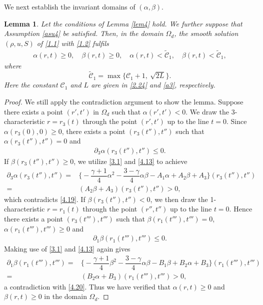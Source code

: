 \documentclass[11pt,reqno]{article}
\newtheorem{lem}{Lemma}[section]
\newcommand{\pa}{\partial}
\numberwithin{equation}{section}
\begin{document}
We next establish the invariant domains of $(\alpha,\beta)$.
\begin{lem}\label{lem5}
Let the conditions of Lemma \ref{lem4} hold. We further suppose that Assumption \ref{asu4} be satisfied. Then, in the domain $\Omega_d$, the smooth solution $(\rho, u, S)$ of \eqref{1.1} with \eqref{1.2} fulfils
\begin{align}\label{4.18}
\alpha(r,t)\geq0,\quad \beta(r,t)\geq0,\quad \alpha(r,t)< \widetilde{\mathcal{C}}_1,\quad \beta(r,t)< \widetilde{\mathcal{C}}_1,
\end{align}
where
$$
\widetilde{\mathcal{C}}_1=\max\{\mathcal{C}_1+1, \ \sqrt{2L}\}.
$$
Here the constant $\mathcal{C}_1$ and $L$ are given in \eqref{2.24} and \eqref{a3}, respectively.
\end{lem}
\begin{proof}
We still apply the contradiction argument to show the lemma. Suppose there exists a point $(r',t')$ in $\Omega_d$ such that $\alpha(r', t')<0$. We draw the 3-characteristic $r=r_3(t)$ through the point $(r',t')$ up to the line $t=0$. Since $\alpha(r_3(0),0)\geq0$, there exists a point $(r_3(t''),t'')$ such that $\alpha(r_3(t''),t'')=0$ and
\begin{align}\label{4.19}
\pa_3\alpha(r_3(t''),t'')\leq0.
\end{align}
If $\beta(r_3(t''),t'')\geq0$, we utilize \eqref{3.1} and \eqref{4.13} to achieve
\begin{align*}
\pa_3 \alpha(r_3(t''),t'') =& \bigg\{ -\dfrac{\gamma+1}{4} \alpha^{2}
  -\dfrac{3-\gamma}{4} \alpha \beta-A_{1}\alpha+ A_{2} \beta +A_3\bigg\}(r_3(t''),t'') \\
  =& (A_{2} \beta +A_3)(r_3(t''),t'')>0,
\end{align*}
which contradicts \eqref{4.19}. If $\beta(r_3(t''),t'')<0$, we then draw the 1-characteristic $r=r_1(t)$ through the point $(r'',t'')$ up to the line $t=0$. Hence there exists a point $(r_3(t'''),t''')$ such that $\beta(r_1(t'''),t''')=0$, $\alpha(r_1(t'''),t''')\geq0$ and
\begin{align}\label{4.20}
\pa_1\beta(r_1(t'''),t''')\leq0.
\end{align}
Making use of \eqref{3.1} and \eqref{4.13} again gives
\begin{align*}
\pa_1 \beta(r_1(t'''),t''') =& \bigg\{-\dfrac{\gamma+1}{4} \beta^{2}
  -\dfrac{3-\gamma}{4} \alpha \beta-B_{1}\beta+ B_{2} \alpha +B_3\bigg\}(r_1(t'''),t''') \\
  =&(B_{2} \alpha +B_3)(r_1(t'''),t''')>0,
\end{align*}
a contradiction with \eqref{4.20}. Thus we have verified that $\alpha(r,t)\geq0$ and $\beta(r,t)\geq0$ in the domain $\Omega_d$.


\end{proof}
\end{document}

